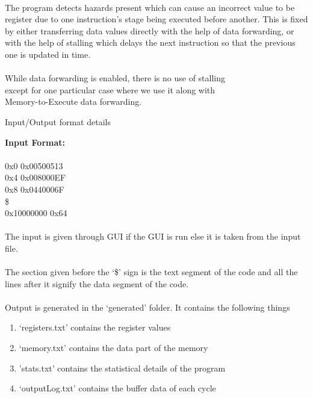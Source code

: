 \documentclass{article}
\begin{document}
\vspace{1cm}\\
The program detects hazards present which can cause an incorrect value to be register due to one instruction's stage being executed before another. This is fixed by either transferring data values directly with the help of data forwarding, or with the help of stalling which delays the next instruction so that the previous one is updated in time.\\\\
While data forwarding is enabled, there is no use of stalling\\ except for one particular case where we use it along with \\Memory-to-Execute data forwarding.

\newpage
\begin{centering}
\begin{Huge}
\textsf{Input/Output format details}\\
\end{Huge}
\vspace{0.6cm}
\end{centering}
\noindent
\Large
{\bf Input Format:}\\\\
0x0 0x00500513\\
0x4 0x008000EF\\
0x8 0x0440006F\\
\$\\
0x10000000 0x64\\\\
The input is given through GUI if the GUI is run else it is taken from the input file.\\\\
The section given before the `\$' sign is the text segment of the code and all the lines after it signify the data segment of the code.\\\\
Output is generated in the `generated' folder. It contains the following things  \\
\begin{enumerate}
    \item `registers.txt' contains the register values
    \item `memory.txt' contains the data part of the memory
    \item 'stats.txt' contains the statistical details of the program
    \item `outputLog.txt' contains the buffer data of each cycle
\end{enumerate}
\end{document}
